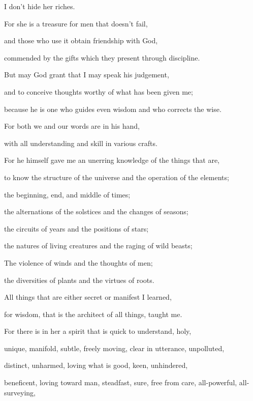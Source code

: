 {\par }{\QB I don’t hide her riches.
\par }{\Q {}For she is a treasure for men that doesn’t fail,
\par }{\QB and those who use it obtain friendship with God,
\par }{\QB commended by the gifts which they present through discipline.
\par }{\BB \par }{\Q {}But may God grant that I may speak his judgement,
\par }{\QB and to conceive thoughts worthy of what has been given me;
\par }{\QB because he is one who guides even wisdom and who corrects the wise.
\par }{\Q {}For both we and our words are in his hand,
\par }{\QB with all understanding and skill in various crafts.
\par }{\Q {}For he himself gave me an unerring knowledge of the things that are,
\par }{\QB to know the structure of the universe and the operation of the elements;
\par }{\QB {}the beginning, end, and middle of times;
\par }{\QB the alternations of the solstices and the changes of seasons;
\par }{\QB {}the circuits of years and the positions of stars;
\par }{\QB {}the natures of living creatures and the raging of wild beasts;
\par }{\QB The violence of
 winds and the thoughts of men;
\par }{\QB the diversities of plants and the virtues of roots.
\par }{\Q {}All things that are either secret or manifest I learned,
\par }{\QB {}for wisdom, that is the architect of all things, taught me.
\par }{\BB \par }{\Q For there is in her a spirit that is quick to understand, holy,
\par }{\QB unique, manifold, subtle, freely moving, clear in utterance, unpolluted,
\par }{\QB distinct, unharmed, loving what is good, keen, unhindered,
\par }{\QB {}beneficent, loving toward man, steadfast, sure, free from care, all-powerful, all-surveying,
}
